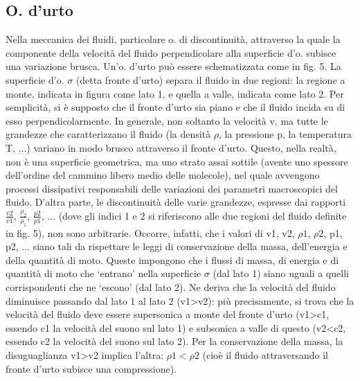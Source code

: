 \documentclass[a4paper]{article}
\begin{document}
\subsection{O. d’urto}
Nella meccanica dei fluidi, particolare o. di discontinuità, attraverso la quale la componente della velocità del fluido perpendicolare alla superficie d’o. subisce una variazione brusca. Un’o. d’urto può essere schematizzata come in fig. 5. La superficie d’o. $\sigma$ (detta fronte d’urto) separa il fluido in due regioni: la regione a monte, indicata in figura come lato 1, e quella a valle, indicata come lato 2. Per semplicità, si è supposto che il fronte d’urto sia piano e che il fluido incida su di esso perpendicolarmente. 
In generale, non soltanto la velocità v, ma tutte le grandezze che caratterizzano il fluido (la densità $\rho$, la pressione p, la temperatura T, ...) variano in modo brusco attraverso il fronte d’urto. Questo, nella realtà, non è una superficie geometrica, ma uno strato assai sottile (avente uno spessore dell’ordine del cammino libero medio delle molecole), nel quale avvengono processi dissipativi responsabili delle variazioni dei parametri macroscopici del fluido. 
D’altra parte, le discontinuità delle varie grandezze, espresse dai rapporti $\frac{v2}{v1}$, $\frac{\rho_2}{\rho_1}$, $\frac{p2}{p1}$, ... (dove gli indici 1 e 2 si riferiscono alle due regioni del fluido definite in fig. 5), non sono arbitrarie. Occorre, infatti, che i valori di v1, v2, $\rho1$, $\rho2$, p1, p2, ... siano tali da rispettare le leggi di conservazione della massa, dell’energia e della quantità di moto. 
Queste impongono che i flussi di massa, di energia e di quantità di moto che ‘entrano’ nella superficie $\sigma$ (dal lato 1) siano uguali a quelli corrispondenti che ne ‘escono’ (dal lato 2). Ne deriva che la velocità del fluido diminuisce passando dal lato 1 al lato 2 (v1>v2): più precisamente, si trova che la velocità del fluido deve essere supersonica a monte del fronte d’urto (v1>c1, essendo c1 la velocità del suono sul lato 1) e subsonica a valle di questo (v2<c2, essendo c2 la velocità del suono sul lato 2). Per la conservazione della massa, la disuguaglianza v1>v2 implica l’altra: $\rho1<\rho2$ (cioè il fluido attraversando il fronte d’urto subisce una compressione).
\end{document}
